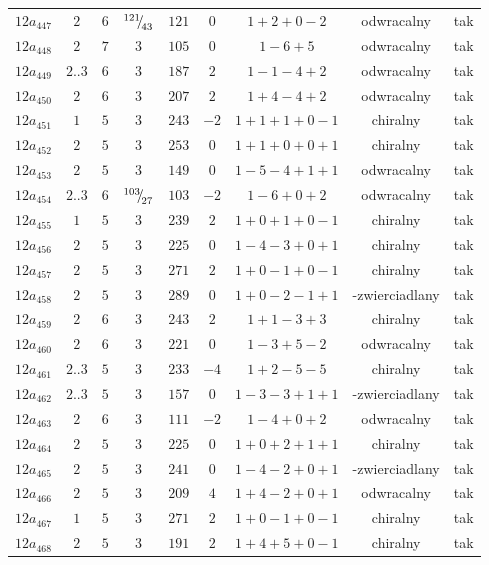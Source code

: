 \begin{longtable}{ccccccccc}
$12a_{447}$ & $2$ & $6$ & ${}^{121}{\mskip -5mu/\mskip -3mu}_{43}$ & $121$ & $0$ & $1+2+0-2$ & odwracalny & tak \\
$12a_{448}$ & $2$ & $7$ & $3$ & $105$ & $0$ & $1-6+5$ & odwracalny & tak \\
$12a_{449}$ & $2..3$ & $6$ & $3$ & $187$ & $2$ & $1-1-4+2$ & odwracalny & tak \\
$12a_{450}$ & $2$ & $6$ & $3$ & $207$ & $2$ & $1+4-4+2$ & odwracalny & tak \\
$12a_{451}$ & $1$ & $5$ & $3$ & $243$ & $-2$ & $1+1+1+0-1$ & chiralny & tak \\
$12a_{452}$ & $2$ & $5$ & $3$ & $253$ & $0$ & $1+1+0+0+1$ & chiralny & tak \\
$12a_{453}$ & $2$ & $5$ & $3$ & $149$ & $0$ & $1-5-4+1+1$ & odwracalny & tak \\
$12a_{454}$ & $2..3$ & $6$ & ${}^{103}{\mskip -5mu/\mskip -3mu}_{27}$ & $103$ & $-2$ & $1-6+0+2$ & odwracalny & tak \\
$12a_{455}$ & $1$ & $5$ & $3$ & $239$ & $2$ & $1+0+1+0-1$ & chiralny & tak \\
$12a_{456}$ & $2$ & $5$ & $3$ & $225$ & $0$ & $1-4-3+0+1$ & chiralny & tak \\
$12a_{457}$ & $2$ & $5$ & $3$ & $271$ & $2$ & $1+0-1+0-1$ & chiralny & tak \\
$12a_{458}$ & $2$ & $5$ & $3$ & $289$ & $0$ & $1+0-2-1+1$ & -zwierciadlany & tak \\
$12a_{459}$ & $2$ & $6$ & $3$ & $243$ & $2$ & $1+1-3+3$ & chiralny & tak \\
$12a_{460}$ & $2$ & $6$ & $3$ & $221$ & $0$ & $1-3+5-2$ & odwracalny & tak \\
$12a_{461}$ & $2..3$ & $5$ & $3$ & $233$ & $-4$ & $1+2-5-5$ & chiralny & tak \\
$12a_{462}$ & $2..3$ & $5$ & $3$ & $157$ & $0$ & $1-3-3+1+1$ & -zwierciadlany & tak \\
$12a_{463}$ & $2$ & $6$ & $3$ & $111$ & $-2$ & $1-4+0+2$ & odwracalny & tak \\
$12a_{464}$ & $2$ & $5$ & $3$ & $225$ & $0$ & $1+0+2+1+1$ & chiralny & tak \\
$12a_{465}$ & $2$ & $5$ & $3$ & $241$ & $0$ & $1-4-2+0+1$ & -zwierciadlany & tak \\
$12a_{466}$ & $2$ & $5$ & $3$ & $209$ & $4$ & $1+4-2+0+1$ & odwracalny & tak \\
$12a_{467}$ & $1$ & $5$ & $3$ & $271$ & $2$ & $1+0-1+0-1$ & chiralny & tak \\
$12a_{468}$ & $2$ & $5$ & $3$ & $191$ & $2$ & $1+4+5+0-1$ & chiralny & tak \\

\end{longtable}
